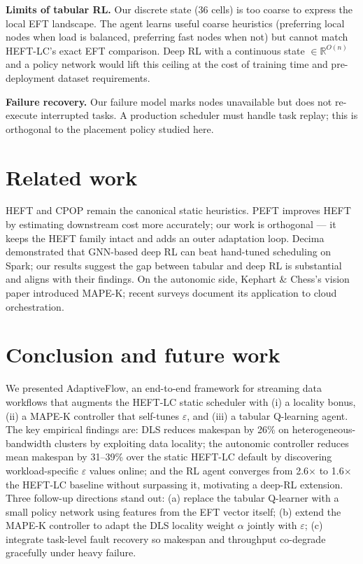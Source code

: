 \documentclass[conference]{IEEEtran}
\begin{document}
\textbf{Limits of tabular RL.} Our discrete state (36 cells) is too coarse
to express the local EFT landscape. The agent learns useful coarse
heuristics (preferring local nodes when load is balanced, preferring fast
nodes when not) but cannot match HEFT-LC's exact EFT comparison. Deep RL
with a continuous state \(\in \mathbb{R}^{O(n)}\) and a policy network
\cite{mao2019decima} would lift this ceiling at the cost of training time
and pre-deployment dataset requirements.

\textbf{Failure recovery.} Our failure model marks nodes unavailable but
does not re-execute interrupted tasks. A production scheduler must handle
task replay; this is orthogonal to the placement policy studied here.

\section{Related work}

HEFT \cite{topcuoglu2002} and CPOP \cite{topcuoglu2002} remain the
canonical static heuristics. PEFT \cite{arabnejad2014peft} improves HEFT by
estimating downstream cost more accurately; our work is orthogonal --- it
keeps the HEFT family intact and adds an outer adaptation loop. Decima
\cite{mao2019decima} demonstrated that GNN-based deep RL can beat
hand-tuned scheduling on Spark; our results suggest the gap between
tabular and deep RL is substantial and aligns with their findings.
On the autonomic side, Kephart \& Chess's vision paper
\cite{kephart2003vision} introduced MAPE-K; recent surveys
\cite{macias2018survey} document its application to cloud orchestration.

\section{Conclusion and future work}\label{sec:future}

We presented AdaptiveFlow, an end-to-end framework for streaming data
workflows that augments the HEFT-LC static scheduler with (i) a locality
bonus, (ii) a MAPE-K controller that self-tunes \(\varepsilon\), and
(iii) a tabular Q-learning agent. The key empirical findings are:
DLS reduces makespan by 26\% on heterogeneous-bandwidth clusters by
exploiting data locality; the autonomic controller reduces mean
makespan by 31--39\% over the static HEFT-LC default by discovering
workload-specific \(\varepsilon\) values online; and the RL agent
converges from 2.6\(\times\) to 1.6\(\times\) the HEFT-LC baseline
without surpassing it, motivating a deep-RL extension.
Three follow-up directions stand out:
(a) replace the tabular Q-learner with a small policy network using
features from the EFT vector itself; (b) extend the MAPE-K controller to
adapt the DLS locality weight \(\alpha\) jointly with \(\varepsilon\);
(c) integrate task-level fault recovery so makespan and throughput
co-degrade gracefully under heavy failure.
\end{document}
